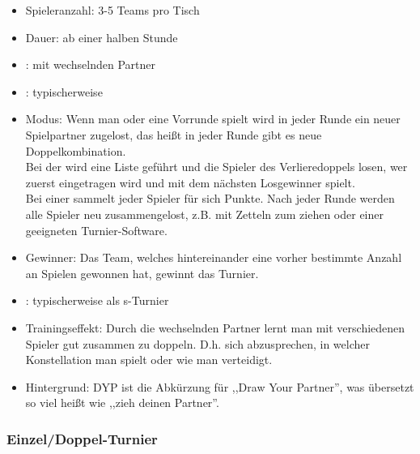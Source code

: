 \begin{itemize}
\item Spieleranzahl: 3-5 Teams pro Tisch
\item Dauer: ab einer halben Stunde
\item {}:  mit wechselnden Partner
\item {}: typischerweise 
\item Modus: 
Wenn man  oder eine Vorrunde spielt wird in jeder Runde ein neuer Spielpartner zugelost, das heißt in jeder Runde gibt es neue Doppelkombination. \\
Bei der  wird eine Liste geführt und die Spieler des Verlieredoppels losen, wer zuerst eingetragen wird und mit dem nächsten Losgewinner spielt. \\
Bei einer  sammelt jeder Spieler für sich Punkte. Nach jeder Runde werden alle Spieler neu zusammengelost, z.B. mit Zetteln zum ziehen oder einer geeigneten Turnier-Software.
\item Gewinner: Das Team, welches hintereinander eine vorher bestimmte Anzahl an Spielen gewonnen hat, gewinnt das Turnier.  
\item {}:
typischerweise als s-Turnier
\item Trainingseffekt: Durch die wechselnden Partner lernt man mit verschiedenen Spieler gut zusammen zu doppeln. D.h. sich abzusprechen, in welcher Konstellation man spielt oder wie man verteidigt.
\item Hintergrund: DYP ist die Abkürzung für ,,Draw Your Partner'', was übersetzt so viel heißt wie ,,zieh deinen Partner''. 
\end{itemize}

\subsubsection{Einzel/Doppel-Turnier}
\label{turniere:vorbereitung:modus:turnier}

